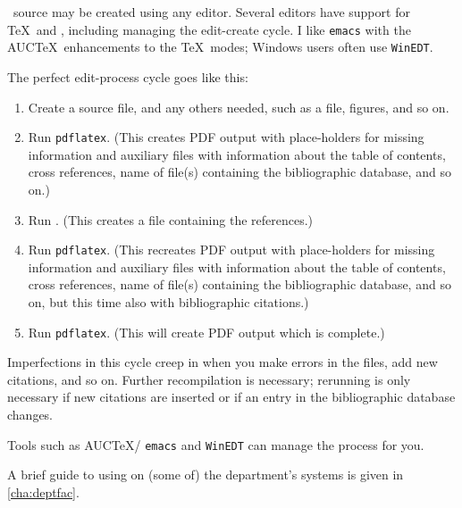 \documentclass[authoryearcitations]{UoYCSproject}
\begin{document}
\LaTeXe\ source may be created using any editor.  Several editors have
support for \TeX\ and \LaTeXe, including managing the edit-create
cycle.  I like \lstinline|emacs| with the AUC\TeX\ enhancements to the
\TeX\ modes; Windows users often use \lstinline|WinEDT|.

The perfect edit-process cycle goes like this:
\begin{enumerate}
\item Create a \LaTeXe{} source file, and any others needed, such as a
  \BibTeX{} file, figures, and so on.
\item Run \lstinline|pdflatex|.  (This creates PDF output with
  place-holders for missing information and auxiliary files with
  information about the table of contents, cross references, name of
  file(s) containing the bibliographic database, and so on.)
\item Run \BibTeX.  (This creates a file containing the references.)
\item Run \lstinline|pdflatex|.  (This recreates PDF output with
  place-holders for missing information and auxiliary files with
  information about the table of contents, cross references, name of
  file(s) containing the bibliographic database, and so on, but this
  time also with bibliographic citations.)
\item Run \lstinline|pdflatex|. (This will create PDF output which is
  complete.)
\end{enumerate}
Imperfections in this cycle creep in when you make errors in the
files, add new citations, and so on.  Further recompilation is
necessary; rerunning \BibTeX{} is only necessary if new citations are
inserted or if an entry in the bibliographic database changes.

Tools such as AUC\TeX{}/ \lstinline|emacs| and \lstinline|WinEDT| can
manage the process for you.

A brief guide to using \LaTeXe{} on (some of) the department's systems
is given in \autoref{cha:deptfac}.


\end{document}
